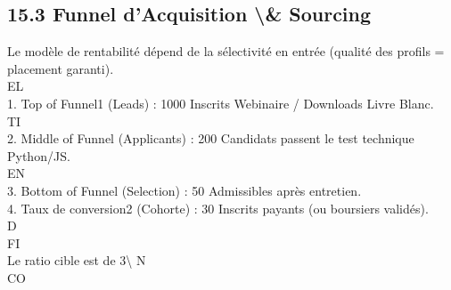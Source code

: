 \documentclass[12pt,landscape,a4paper]{article}
\begin{document}
\subsection{15.3 Funnel d’Acquisition \textbackslash{}& Sourcing}
Le modèle de rentabilité dépend de la sélectivité en entrée (qualité des profils = placement garanti).\\
\vspace{0.5em}
\vspace{0.5em}
\vspace{0.5em}
\vspace{0.5em}
EL\\
1. Top of Funnel1 (Leads) : 1000 Inscrits Webinaire / Downloads Livre Blanc.\\
\vspace{0.5em}
\vspace{0.5em}
\vspace{0.5em}
\vspace{0.5em}
TI\\
2. Middle of Funnel (Applicants) : 200 Candidats passent le test technique Python/JS.\\
\vspace{0.5em}
\vspace{0.5em}
\vspace{0.5em}
\vspace{0.5em}
EN\\
3. Bottom of Funnel (Selection) : 50 Admissibles après entretien.\\
\vspace{0.5em}
4. Taux de conversion2 (Cohorte) : 30 Inscrits payants (ou boursiers validés).\\
\vspace{0.5em}
\vspace{0.5em}
\vspace{0.5em}
\vspace{0.5em}
D\\
FI\\
Le ratio cible est de 3\textbackslash{}%
\vspace{0.5em}
N\\
CO\\
\end{document}
